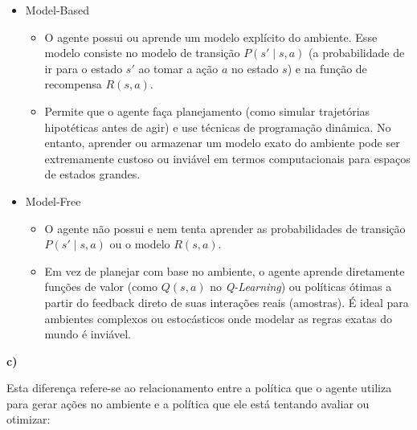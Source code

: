 \documentclass[a4paper,12pt]{article}
\begin{document}
\begin{itemize}
	\item Model-Based 
	\begin{itemize}
		\item O agente possui ou aprende um modelo explícito do ambiente. Esse modelo consiste no modelo de transição $P(s' \mid s, a)$ (a probabilidade de ir para o estado $s'$ ao tomar a ação $a$ no estado $s$) e na função de recompensa $R(s, a)$.
		\item Permite que o agente faça planejamento (como simular trajetórias hipotéticas antes de agir) e use técnicas de programação dinâmica. No entanto, aprender ou armazenar um modelo exato do ambiente pode ser extremamente custoso ou inviável em termos computacionais para espaços de estados grandes.
	\end{itemize}
	
	\item Model-Free
	\begin{itemize}
		\item O agente não possui e nem tenta aprender as probabilidades de transição $P(s' \mid s, a)$ ou o modelo $R(s,a)$.
		\item Em vez de planejar com base no ambiente, o agente aprende diretamente funções de valor (como $Q(s,a)$ no \textit{Q-Learning}) ou políticas ótimas a partir do feedback direto de suas interações reais (amostras). É ideal para ambientes complexos ou estocásticos onde modelar as regras exatas do mundo é inviável.\\
	\end{itemize}
\end{itemize}


\textbf{c)} 

Esta diferença refere-se ao relacionamento entre a política que o agente utiliza para gerar ações no ambiente e a política que ele está tentando avaliar ou otimizar:
\end{document}
